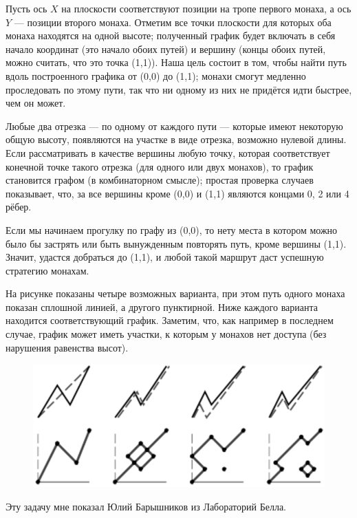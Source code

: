 Пусть ось $X$ на плоскости соответствуют позиции на тропе первого монаха, а ось $Y$ --- позиции второго монаха.
Отметим все точки плоскости для которых оба монаха находятся на одной высоте;
полученный график будет включать в себя начало координат (это начало обоих путей) и вершину (концы обоих путей, можно считать, что это точка (1,1)).
Наша цель состоит в том, чтобы найти путь вдоль построенного графика от (0,0) до (1,1);
монахи смогут медленно проследовать по этому пути, так что ни одному из них не придётся идти быстрее, чем он может.

Любые два отрезка --- по одному от каждого пути --- которые имеют некоторую общую высоту, появляются на участке в виде отрезка, возможно нулевой длины.
Если рассматривать в качестве вершины любую точку, которая соответствует конечной точке такого отрезка (для одного или двух монахов), то график становится графом (в комбинаторном смысле);
простая проверка случаев показывает, что, за все вершины кроме (0,0) и (1,1) являются концами 0, 2 или 4 рёбер.

Если мы начинаем прогулку по графу из (0,0), то нету места в котором можно было бы застрять или быть вынужденным повторять путь, кроме вершины (1,1).
Значит, удастся добраться до (1,1), и любой такой маршрут даст успешную стратегию монахам.
\heart

На рисунке показаны четыре возможных варианта, при этом путь одного монаха показан сплошной линией, а другого пунктирной.
Ниже каждого варианта находится соответствующий график.
Заметим, что, как например в последнем случае, график может иметь участки, к которым у монахов нет доступа (без нарушения равенства высот).

\begin{figure}[h!]
\centering
\includegraphics[scale=0.9]{Figs/Toughies/monks}
\end{figure} 

Эту задачу мне показал Юлий Барышников из Лабораторий Белла.

